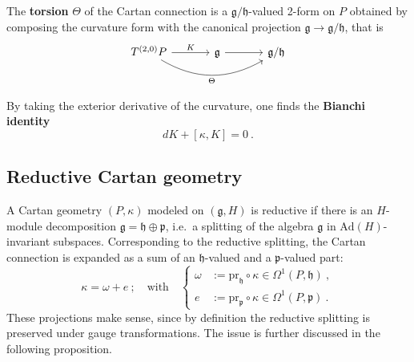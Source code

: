 \documentclass[11pt]{article}
\begin{document}
The \textbf{torsion} $\Theta$ of the Cartan connection is a 
$\mathfrak{g}/\mathfrak{h}$-valued 2-form on $P$ obtained by 
composing the curvature form with the canonical projection 
$\mathfrak{g} \to \mathfrak{g}/\mathfrak{h}$, that is
\begin{displaymath}
\begin{tikzcd}[column sep=1.2cm]
	T^{(2,0)} P
				\arrow{r}{K}
				\arrow[bend right,swap]{rr}{\Theta}
		& \mathfrak{g}
				\arrow{r}
		& \mathfrak{g}/\mathfrak{h}
\end{tikzcd}
\end{displaymath}

By taking the exterior derivative of the curvature, one finds the 
\textbf{Bianchi identity}
\begin{equation}\label{eq:cartan_bianchi}
	dK + [\kappa,K] = 0~.
\end{equation}

\subsection{Reductive Cartan geometry}

A Cartan geometry $(P,\kappa)$ modeled on $(\mathfrak{g},H)$ is 
reductive if there is an $H$-module decomposition $\mathfrak{g} = 
\mathfrak{h} \oplus \mathfrak{p}$, i.e.~a splitting of the 
algebra $\mathfrak{g}$ in $\mathrm{Ad}(H)$-invariant subspaces.  
Corresponding to the reductive splitting, the Cartan connection 
is expanded as a sum of an $\mathfrak{h}$-valued and a 
$\mathfrak{p}$-valued part:
%
\begin{displaymath}
	\kappa = \omega + e~;\quad
	\text{with}
	\quad\left\{
	\begin{aligned}
		\omega &:= \mathrm{pr}_\mathfrak{h}\circ\kappa \in 
		\Omega^1(P,\mathfrak{h})~, \\
		e &:= \mathrm{pr}_\mathfrak{p}\circ\kappa \in 
		\Omega^1(P,\mathfrak{p})~.
	\end{aligned}
	\right.
\end{displaymath}
These projections make sense, since by definition the reductive 
splitting is preserved under gauge transformations. The issue is 
further discussed in the following proposition.
\end{document}
